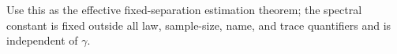 Use this as the effective fixed-separation estimation theorem; the spectral constant is fixed outside all law, sample-size, name, and trace quantifiers and is independent of \(\gamma\).